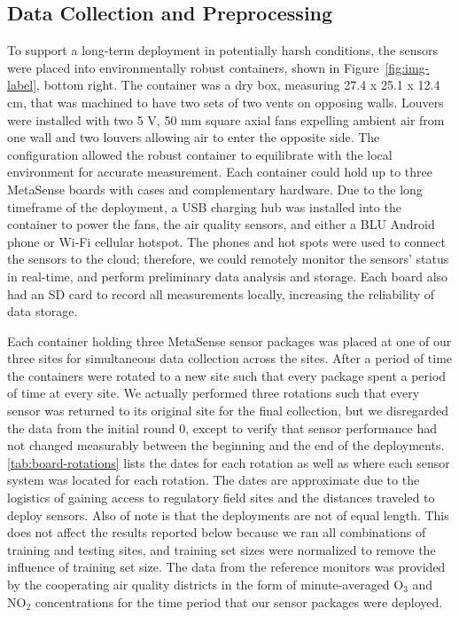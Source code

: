 \documentclass[journal abbreviation, manuscript]{copernicus}
\newcommand{\textus}[1]{$_{\text{#1}}$}
\begin{document}
\subsection{Data Collection and Preprocessing}
\label{DataCollection}
To support a long-term deployment in potentially harsh conditions, the sensors were placed into environmentally robust containers, shown in Figure~\ref{fig:img-label}, bottom right. The container was a dry box, measuring 27.4 x 25.1 x 12.4 cm, that was machined to have two sets of two vents on opposing walls. Louvers were installed with two 5 V, 50 mm square axial fans expelling ambient air from one wall and two louvers allowing air to enter the opposite side. The configuration allowed the robust container to equilibrate with the local environment for accurate measurement.  Each container could hold up to three MetaSense boards with cases and complementary hardware.  Due to the long timeframe of the deployment, a USB charging hub was installed into the container to power the fans, the air quality sensors, and either a BLU Android phone or Wi-Fi cellular hotspot. The phones and hot spots were used to connect the sensors to the cloud; therefore, we could remotely monitor the sensors’ status in real-time, and perform preliminary data analysis and storage. Each board also had an SD card to record all measurements locally, increasing the reliability of data storage. 

Each container holding three MetaSense sensor packages was placed at one of our three sites for simultaneous data collection across the sites.  After a period of time the containers were rotated to a new site such that every package spent a period of time at every site.  We actually performed three rotations such that every sensor was returned to its original site for the final collection, but we disregarded the data from the initial round 0, except to verify that sensor performance had not changed measurably between the beginning and the end of the deployments. \autoref{tab:board-rotations} lists the dates for each rotation as well as where each sensor system was located for each rotation.  The dates are approximate due to the logistics of gaining access to regulatory field sites and the distances traveled to deploy sensors.  Also of note is that the deployments are not of equal length.  This does not affect the results reported below because we ran all combinations of training and testing sites, and training set sizes were normalized to remove the influence of training set size. The data from the reference monitors was provided by the cooperating air quality districts in the form of minute-averaged O\textus{3} and NO\textus{2} concentrations for the time period that our sensor packages were deployed.
\end{document}
